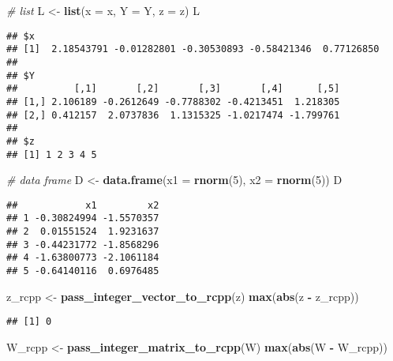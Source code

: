 \documentclass[
]{book}
\newenvironment{Shaded}{\begin{snugshade}}{\end{snugshade}}
\newcommand{\AttributeTok}[1]{\textcolor[rgb]{0.13,0.29,0.53}{#1}}
\newcommand{\CommentTok}[1]{\textcolor[rgb]{0.56,0.35,0.01}{\textit{#1}}}
\newcommand{\DecValTok}[1]{\textcolor[rgb]{0.00,0.00,0.81}{#1}}
\newcommand{\FunctionTok}[1]{\textcolor[rgb]{0.13,0.29,0.53}{\textbf{#1}}}
\newcommand{\NormalTok}[1]{#1}
\newcommand{\OtherTok}[1]{\textcolor[rgb]{0.56,0.35,0.01}{#1}}
\newcommand{\SpecialCharTok}[1]{\textcolor[rgb]{0.81,0.36,0.00}{\textbf{#1}}}
\begin{document}
\begin{Shaded}
\begin{Highlighting}[]
\CommentTok{\# list}
\NormalTok{L }\OtherTok{\textless{}{-}} \FunctionTok{list}\NormalTok{(}\AttributeTok{x =}\NormalTok{ x, }\AttributeTok{Y =}\NormalTok{ Y, }\AttributeTok{z =}\NormalTok{ z)}
\NormalTok{L}
\end{Highlighting}
\end{Shaded}

\begin{verbatim}
## $x
## [1]  2.18543791 -0.01282801 -0.30530893 -0.58421346  0.77126850
## 
## $Y
##          [,1]       [,2]       [,3]       [,4]      [,5]
## [1,] 2.106189 -0.2612649 -0.7788302 -0.4213451  1.218305
## [2,] 0.412157  2.0737836  1.1315325 -1.0217474 -1.799761
## 
## $z
## [1] 1 2 3 4 5
\end{verbatim}

\begin{Shaded}
\begin{Highlighting}[]
\CommentTok{\# data frame}
\NormalTok{D }\OtherTok{\textless{}{-}} \FunctionTok{data.frame}\NormalTok{(}\AttributeTok{x1 =} \FunctionTok{rnorm}\NormalTok{(}\DecValTok{5}\NormalTok{), }\AttributeTok{x2 =} \FunctionTok{rnorm}\NormalTok{(}\DecValTok{5}\NormalTok{))}
\NormalTok{D}
\end{Highlighting}
\end{Shaded}

\begin{verbatim}
##            x1         x2
## 1 -0.30824994 -1.5570357
## 2  0.01551524  1.9231637
## 3 -0.44231772 -1.8568296
## 4 -1.63800773 -2.1061184
## 5 -0.64140116  0.6976485
\end{verbatim}

\begin{Shaded}
\begin{Highlighting}[]
\NormalTok{z\_rcpp }\OtherTok{\textless{}{-}} \FunctionTok{pass\_integer\_vector\_to\_rcpp}\NormalTok{(z)}
\FunctionTok{max}\NormalTok{(}\FunctionTok{abs}\NormalTok{(z }\SpecialCharTok{{-}}\NormalTok{ z\_rcpp))}
\end{Highlighting}
\end{Shaded}

\begin{verbatim}
## [1] 0
\end{verbatim}

\begin{Shaded}
\begin{Highlighting}[]
\NormalTok{W\_rcpp }\OtherTok{\textless{}{-}} \FunctionTok{pass\_integer\_matrix\_to\_rcpp}\NormalTok{(W)}
\FunctionTok{max}\NormalTok{(}\FunctionTok{abs}\NormalTok{(W }\SpecialCharTok{{-}}\NormalTok{ W\_rcpp))}
\end{Highlighting}
\end{Shaded}
\end{document}
